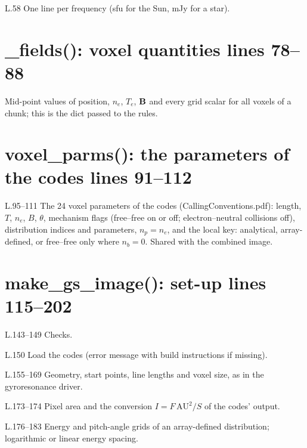 \begin{lines}
\item[L.58] One line per frequency (sfu for the Sun, mJy for a star).
\end{lines}
\section*{\normalsize \_fields(): voxel quantities \hfill{\small\mdseries\color{gray}lines 78--88}}

Mid-point values of position, $n_e$, $T_e$, $\mathbf{B}$ and every grid scalar for all voxels of a chunk; this is the dict passed to the rules.

\section*{\normalsize voxel\_parms(): the parameters of the codes \hfill{\small\mdseries\color{gray}lines 91--112}}

\begin{lines}
\item[L.95–111] The 24 voxel parameters of the codes (CallingConventions.pdf): length, $T$, $n_e$, $B$, $\theta$, mechanism flags (free--free on or off; electron--neutral collisions off), distribution indices and parameters, $n_p=n_e$, and the local key: analytical, array-defined, or free--free only where $n_b=0$. Shared with the combined image.
\end{lines}
\section*{\normalsize make\_gs\_image(): set-up \hfill{\small\mdseries\color{gray}lines 115--202}}

\begin{lines}
\item[L.143–149] Checks.
\item[L.150] Load the codes (error message with build instructions if missing).
\item[L.155–169] Geometry, start points, line lengths and voxel size, as in the gyroresonance driver.
\item[L.173–174] Pixel area and the conversion $I=F\,\text{AU}^2/S$ of the codes' output.
\item[L.176–183] Energy and pitch-angle grids of an array-defined distribution; logarithmic or linear energy spacing.
\end{lines}
